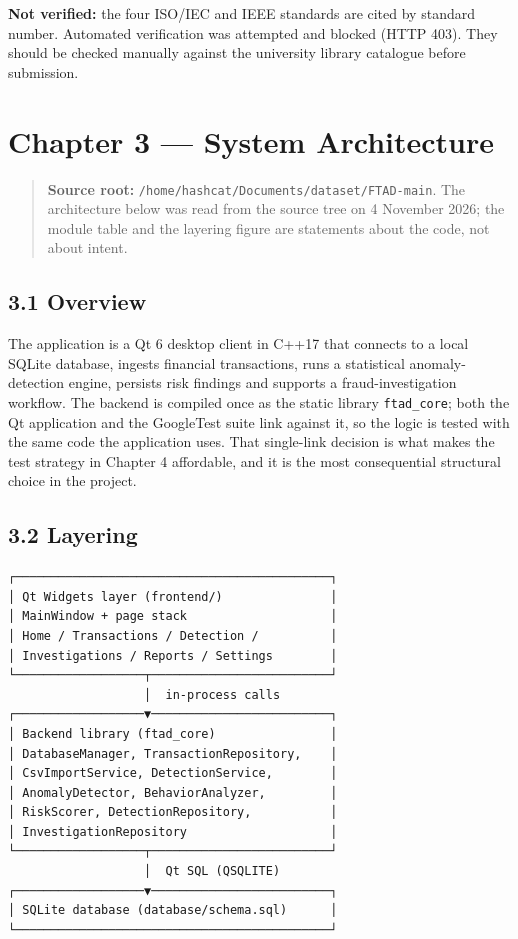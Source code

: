 \documentclass[
  12pt,
]{report}
\begin{document}
\textbf{Not verified:} the four ISO/IEC and IEEE standards are cited by
standard number. Automated verification was attempted and blocked (HTTP
403). They should be checked manually against the university library
catalogue before submission.

\chapter{Chapter 3 --- System
Architecture}\label{chapter-3-system-architecture}

\begin{quote}
\textbf{Source root:}
\texttt{/\allowbreak{}home/\allowbreak{}hashcat/\allowbreak{}Documents/\allowbreak{}dataset/\allowbreak{}FTAD-main}. The architecture
below was read from the source tree on 4 November 2026; the module table
and the layering figure are statements about the code, not about intent.
\end{quote}

\section{3.1 Overview}\label{overview}

The application is a Qt 6 desktop client in C++17 that connects to a
local SQLite database, ingests financial transactions, runs a
statistical anomaly-detection engine, persists risk findings and
supports a fraud-investigation workflow. The backend is compiled once as
the static library \texttt{ftad\_core}; both the Qt application and the
GoogleTest suite link against it, so the logic is tested with the same
code the application uses. That single-link decision is what makes the
test strategy in Chapter 4 affordable, and it is the most consequential
structural choice in the project.

\section{3.2 Layering}\label{layering}

\begin{verbatim}
┌────────────────────────────────────────────┐
│ Qt Widgets layer (frontend/)               │
│ MainWindow + page stack                    │
│ Home / Transactions / Detection /          │
│ Investigations / Reports / Settings        │
└──────────────────┬─────────────────────────┘
                   │  in-process calls
┌──────────────────▼─────────────────────────┐
│ Backend library (ftad_core)                │
│ DatabaseManager, TransactionRepository,    │
│ CsvImportService, DetectionService,        │
│ AnomalyDetector, BehaviorAnalyzer,         │
│ RiskScorer, DetectionRepository,           │
│ InvestigationRepository                    │
└──────────────────┬─────────────────────────┘
                   │  Qt SQL (QSQLITE)
┌──────────────────▼─────────────────────────┐
│ SQLite database (database/schema.sql)      │
└────────────────────────────────────────────┘
\end{verbatim}
\end{document}

